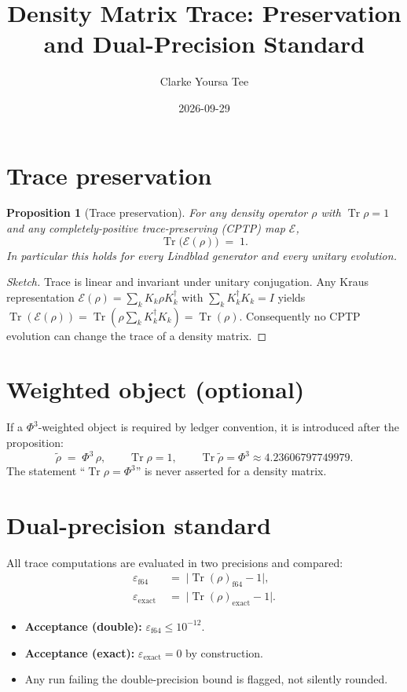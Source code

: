 \documentclass[11pt]{article}
\title{Density Matrix Trace: Preservation and Dual-Precision Standard}
\author{Clarke Yoursa Tee}
\date{2026-09-29}
\providecommand{\Tr}{\operatorname{Tr}}
\providecommand{\PHIthree}{\Phi^3}
\providecommand{\EPSdp}{\varepsilon_{\mathrm{f64}}}
\providecommand{\EPSsp}{\varepsilon_{\mathrm{exact}}}
\newtheorem{proposition}{Proposition}
\begin{document}
\maketitle

\section{Trace preservation}

\begin{proposition}[Trace preservation]\label{prop:trace-preservation}
For any density operator $\rho$ with $\Tr\rho=1$ and any
completely-positive trace-preserving (CPTP) map $\mathcal{E}$,
\begin{equation}
  \Tr\!\bigl(\mathcal{E}(\rho)\bigr) \;=\; 1.
  \label{eq:trace-preservation}
\end{equation}
In particular this holds for every Lindblad generator and every unitary evolution.
\end{proposition}

\begin{proof}[Sketch]
Trace is linear and invariant under unitary conjugation. Any Kraus
representation $\mathcal{E}(\rho)=\sum_k K_k \rho K_k^{\dagger}$ with
$\sum_k K_k^{\dagger}K_k = I$ yields
$\Tr(\mathcal{E}(\rho)) = \Tr(\rho \sum_k K_k^{\dagger}K_k) = \Tr(\rho)$.
Consequently no CPTP evolution can change the trace of a density matrix.
\end{proof}

\section{Weighted object (optional)}

If a $\PHIthree$-weighted object is required by ledger convention, it is
introduced after the proposition:
\begin{equation}
  \tilde\rho \;=\; \PHIthree\,\rho,
  \qquad
  \Tr\rho = 1,
  \qquad
  \Tr\tilde\rho = \PHIthree \approx 4.23606797749979.
\end{equation}
The statement ``$\Tr\rho = \PHIthree$'' is never asserted for a density matrix.

\section{Dual-precision standard}\label{sec:dual-precision}

All trace computations are evaluated in two precisions and compared:
\begin{align}
  \EPSdp &\;=\; \bigl|\Tr(\rho)_{\mathrm{f64}} - 1\bigr|, \\
  \EPSsp &\;=\; \bigl|\Tr(\rho)_{\mathrm{exact}} - 1\bigr|.
\end{align}
\begin{itemize}
  \item \textbf{Acceptance (double):} $\EPSdp \le 10^{-12}$.
  \item \textbf{Acceptance (exact):} $\EPSsp = 0$ by construction.
  \item Any run failing the double-precision bound is flagged, not silently rounded.
\end{itemize}
\end{document}
